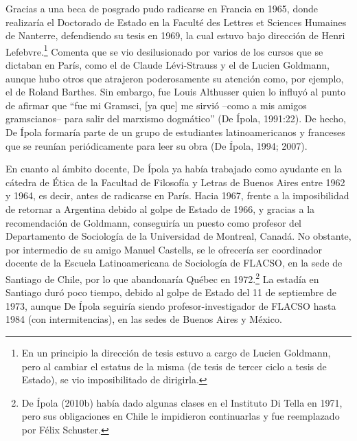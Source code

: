 Gracias a una beca de posgrado pudo radicarse en Francia en 1965, donde realizaría el Doctorado de Estado en la Faculté des Lettres et Sciences Humaines de Nanterre, defendiendo su tesis en 1969, la cual estuvo bajo dirección de Henri Lefebvre.\footnote{En un principio la dirección de tesis estuvo a cargo de Lucien Goldmann, pero al cambiar el estatus de la misma (de tesis de tercer ciclo a tesis de Estado), se vio imposibilitado de dirigirla.} Comenta que se vio desilusionado por varios de los cursos que se dictaban en París, como el de Claude Lévi-Strauss y el de Lucien Goldmann, aunque hubo otros que atrajeron poderosamente su atención como, por ejemplo, el de Roland Barthes. Sin embargo, fue Louis Althusser quien lo influyó al punto de afirmar que ``fue mi Gramsci, [ya que] me sirvió --como a mis amigos gramscianos-- para salir del marxismo dogmático'' (De Ípola, 1991:22). De hecho, De Ípola formaría parte de un grupo de estudiantes latinoamericanos y franceses que se reunían periódicamente para leer su obra (De Ípola, 1994; 2007).

En cuanto al ámbito docente, De Ípola ya había trabajado como ayudante en la cátedra de Ética de la Facultad de Filosofía y Letras de Buenos Aires entre 1962 y 1964, es decir, antes de radicarse en París. Hacia 1967, frente a la imposibilidad de retornar a Argentina debido al golpe de Estado de 1966, y gracias a la recomendación de Goldmann, conseguiría un puesto como profesor del Departamento de Sociología de la Universidad de Montreal, Canadá. No obstante, por intermedio de su amigo Manuel Castells, se le ofrecería ser coordinador docente de la Escuela Latinoamericana de Sociología de FLACSO, en la sede de Santiago de Chile, por lo que abandonaría Québec en 1972.\footnote{De Ípola (2010b) había dado algunas clases en el Instituto Di Tella en 1971, pero sus obligaciones en Chile le impidieron continuarlas y fue reemplazado por Félix Schuster.} La estadía en Santiago duró poco tiempo, debido al golpe de Estado del 11 de septiembre de 1973, aunque De Ípola seguiría siendo profesor-investigador de FLACSO hasta 1984 (con intermitencias), en las sedes de Buenos Aires y México.

